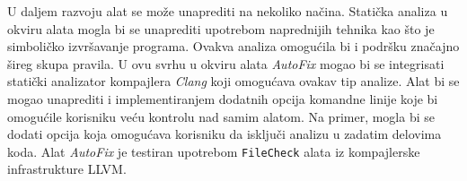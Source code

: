 \documentclass[12pt,oneside]{memoir}
\begin{document}
\par
U daljem razvoju alat se mo\v{z}e unaprediti na nekoliko na\v{c}ina. 
Stati\v{c}ka analiza u okviru alata mogla bi se unaprediti upotrebom naprednijih tehnika kao \v{s}to je simboli\v{c}ko izvr\v{s}avanje programa. Ovakva analiza
omogu\'{c}ila bi i podr\v{s}ku zna\v{c}ajno \v{s}ireg skupa pravila. U ovu svrhu u okviru alata \textit{AutoFix} mogao bi se integrisati stati\v{c}ki analizator kompajlera \textit{Clang} koji omogu\'{c}ava ovakav tip analize. Alat bi se mogao unaprediti i implementiranjem dodatnih opcija komandne linije koje bi omogu\'{c}ile korisniku ve\'{c}u
kontrolu nad samim alatom. Na primer, mogla bi se dodati opcija koja omogu\'{c}ava korisniku da isklju\v{c}i analizu u zadatim delovima koda.
Alat \textit{AutoFix} je testiran upotrebom \texttt{FileCheck} alata iz kompajlerske infrastrukture LLVM.


\literatura

\backmatter
\end{document}
